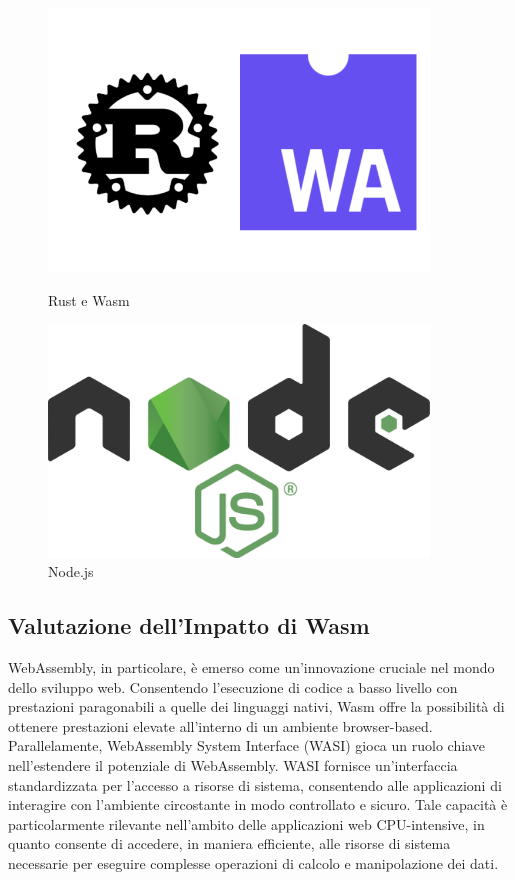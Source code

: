 \begin{figure}
        \centering
        \begin{minipage}{0.40\textwidth}
            \centering
            \includegraphics[width=0.9\textwidth]{images/rustwasm.jpg} 
            \caption{Rust e Wasm}
        \end{minipage}\hfill
        \begin{minipage}{0.40\textwidth}
            \centering
            \includegraphics[width=0.9\textwidth]{images/node.png} 
            \caption{Node.js}
        \end{minipage}
    \end{figure}

\subsection{Valutazione dell'Impatto di Wasm}
WebAssembly, in particolare, è emerso come un'innovazione cruciale nel mondo dello sviluppo web.
Consentendo l'esecuzione di codice a basso livello con prestazioni paragonabili a quelle dei linguaggi nativi, Wasm offre la possibilità di ottenere prestazioni elevate all'interno di un ambiente browser-based.
\\Parallelamente, WebAssembly System Interface (WASI) gioca un ruolo chiave nell'estendere il potenziale di WebAssembly. WASI fornisce un'interfaccia standardizzata per l'accesso a risorse di sistema, consentendo alle applicazioni di interagire con l'ambiente circostante in modo controllato e sicuro. Tale capacità è particolarmente rilevante nell'ambito delle applicazioni web CPU-intensive, in quanto consente di accedere, in maniera efficiente, alle risorse di sistema necessarie per eseguire complesse operazioni di calcolo e manipolazione dei dati.

